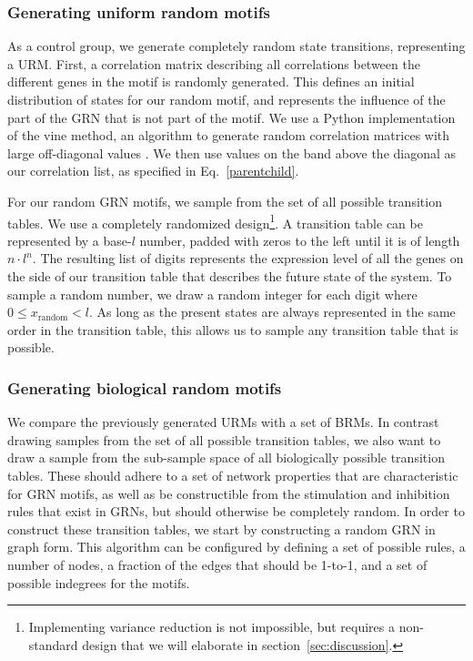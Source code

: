 \documentclass[../main.tex]{subfiles}
\begin{document}
\subsubsection{Generating uniform random motifs}

As a control group, we generate completely random state transitions, representing a URM.
First, a correlation matrix describing all correlations between the different genes in the motif is randomly generated.
This defines an initial distribution of states for our random motif, and represents the influence of the part of the GRN that is not part of the motif.
We use a Python implementation of the vine method, an algorithm to generate random correlation matrices with large off-diagonal values \cite{lewandowski2009generating}.
We then use values on the band above the diagonal as our correlation list, as specified in Eq.~\ref{parentchild}. %

For our random GRN motifs, we sample from the set of all possible transition tables.
We use a completely randomized design\footnote{Implementing variance reduction is not impossible, but requires a non-standard design that we will elaborate in section~\ref{sec:discussion}.}.
A transition table can be represented by a base-$l$ number, padded with zeros to the left until it is of length $n \cdot l^n$.
The resulting list of digits represents the expression level of all the genes on the side of our transition table that describes the future state of the system.
To sample a random number, we draw a random integer for each digit where $0 \le x_\mathrm{random} < l$.
As long as the present states are always represented in the same order in the transition table, this allows us to sample any transition table that is possible.

\subsubsection{Generating biological random motifs}

We compare the previously generated URMs with a set of BRMs.
In contrast drawing samples from the set of all possible transition tables, we also want to draw a sample from the sub-sample space of all biologically possible transition tables.
These should adhere to a set of network properties that are characteristic for GRN motifs, as well as be constructible from the stimulation and inhibition rules that exist in GRNs, but should otherwise be completely random.
In order to construct these transition tables, we start by constructing a random GRN in graph form.
This algorithm can be configured by defining a set of possible rules, a number of nodes, a fraction of the edges that should be 1-to-1, and a set of possible indegrees for the motifs.
\end{document}
